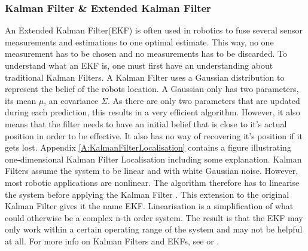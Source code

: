 \subsubsection{Kalman Filter \& Extended Kalman Filter}
An Extended Kalman Filter(EKF) is often used in robotics to fuse several sensor measurements and estimations to one optimal estimate. This way, no one measurement has to be chosen and no measurements has to be discarded. To understand what an EKF is, one must first have an understanding about traditional Kalman Filters. A Kalman Filter uses a Gaussian distribution to represent the belief of the robots location. A Gaussian only has two parameters, its mean $\mu$, an covariance $\Sigma$. As there are only two parameters that are updated during each prediction, this results in a very efficient algorithm. However, it also means that the filter needs to have an initial belief that is close to it's actual position in order to be effective. It also has no way of recovering it's position if it gets lost. Appendix \ref{A:KalmanFilterLocalisation} contains a figure illustrating one-dimensional Kalman Filter Localisation including some explanation.
Kalman Filters assume the system to be linear and with white Gaussian noise. However, most robotic applications are nonlinear. The algorithm therefore has to linearise the system before applying the Kalman Filter \cite{SiegwartRoland2011Itam}. This extension to the original Kalman Filter gives it the name EKF. Linearisation is a simplification of what could otherwise be a complex n-th order system. The result is that the EKF may only work within a certain operating range of the system and may not be helpful at all. For more info on Kalman Filters and EKFs, see \cite{SiegwartRoland2011Itam} or \cite{ThrunSebastian2005Pr}.

